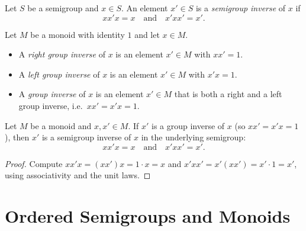 \begin{definition}
\label{def:semigroup-inverse}
Let \(S\) be a semigroup and \(x\in S\). An element \(x'\in S\) is a \emph{semigroup inverse} of \(x\) if
\[
x x' x = x \quad\text{and}\quad x' x x' = x'.
\]
\end{definition}

\begin{definition}
\label{def:group-inverse}
Let \(M\) be a monoid with identity \(1\) and let \(x\in M\).
\begin{itemize}
  \item A \emph{right group inverse} of \(x\) is an element \(x'\in M\) with \(x x' = 1\).
  \item A \emph{left group inverse} of \(x\) is an element \(x'\in M\) with \(x' x = 1\).
  \item A \emph{group inverse} of \(x\) is an element \(x'\in M\) that is both a right and a left group inverse, i.e.\ \(x x' = x' x = 1\).
\end{itemize}
\end{definition}

\begin{lemma}
\label{lem:group-inverse-implies-semigroup-inverse}
Let \(M\) be a monoid and \(x,x'\in M\). If \(x'\) is a group inverse of \(x\) (so \(x x' = x' x = 1\)), then \(x'\) is a semigroup inverse of \(x\) in the underlying semigroup:
\[
x x' x = x \quad\text{and}\quad x' x x' = x'.
\]
\end{lemma}
\begin{proof}
Compute \(x x' x = (x x') x = 1\cdot x = x\) and \(x' x x' = x' (x x') = x' \cdot 1 = x'\), using associativity and the unit laws.
\end{proof}

\chapter {Ordered Semigroups and Monoids}


